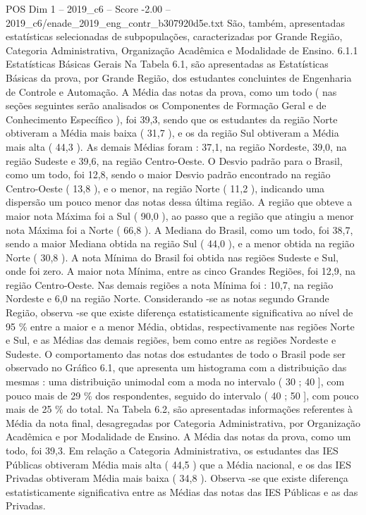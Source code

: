 \begin{textsample}{POS Dim 1 – 2019\_c6 – Score -2.00 – 2019\_c6/enade\_2019\_eng\_contr\_b307920d5e.txt}
São, também, apresentadas estatísticas selecionadas de subpopulações, caracterizadas por Grande Região, Categoria Administrativa, Organização Acadêmica e Modalidade de Ensino. 6.1.1 Estatísticas Básicas Gerais Na Tabela 6.1, são apresentadas as Estatísticas Básicas da prova, por Grande Região, dos estudantes concluintes de Engenharia de Controle e Automação.
A Média das notas da prova, como um todo ( nas seções seguintes serão analisados os Componentes de Formação Geral e de Conhecimento Específico ), foi 39,3, sendo que os estudantes da região Norte obtiveram a Média mais baixa ( 31,7 ), e os da região Sul obtiveram a Média mais alta ( 44,3 ).
As demais Médias foram : 37,1, na região Nordeste, 39,0, na região Sudeste e 39,6, na região Centro-Oeste.
O Desvio padrão para o Brasil, como um todo, foi 12,8, sendo o maior Desvio padrão encontrado na região Centro-Oeste ( 13,8 ), e o menor, na região Norte ( 11,2 ), indicando uma dispersão um pouco menor das notas dessa última região.
A região que obteve a maior nota Máxima foi a Sul ( 90,0 ), ao passo que a região que atingiu a menor nota Máxima foi a Norte ( 66,8 ).
A Mediana do Brasil, como um todo, foi 38,7, sendo a maior Mediana obtida na região Sul ( 44,0 ), e a menor obtida na região Norte ( 30,8 ).
A nota Mínima do Brasil foi obtida nas regiões Sudeste e Sul, onde foi zero.
A maior nota Mínima, entre as cinco Grandes Regiões, foi 12,9, na região Centro-Oeste.
Nas demais regiões a nota Mínima foi : 10,7, na região Nordeste e 6,0 na região Norte.
Considerando -se as notas segundo Grande Região, observa -se que existe diferença estatisticamente significativa ao nível de 95 \% entre a maior e a menor Média, obtidas, respectivamente nas regiões Norte e Sul, e as Médias das demais regiões, bem como entre as regiões Nordeste e Sudeste.
O comportamento das notas dos estudantes de todo o Brasil pode ser observado no Gráfico 6.1, que apresenta um histograma com a distribuição das mesmas : uma distribuição unimodal com a moda no intervalo ( 30 ; 40 ], com pouco mais de 29 \% dos respondentes, seguido do intervalo ( 40 ; 50 ], com pouco mais de 25 \% do total.
Na Tabela 6.2, são apresentadas informações referentes à Média da nota final, desagregadas por Categoria Administrativa, por Organização Acadêmica e por Modalidade de Ensino.
A Média das notas da prova, como um todo, foi 39,3.
Em relação a Categoria Administrativa, os estudantes das IES Públicas obtiveram Média mais alta ( 44,5 ) que a Média nacional, e os das IES Privadas obtiveram Média mais baixa ( 34,8 ).
Observa -se que existe diferença estatisticamente significativa entre as Médias das notas das IES Públicas e as das Privadas.

\end{textsample}
